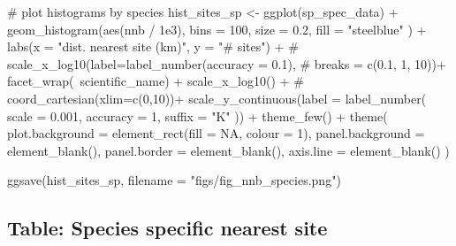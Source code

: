 \documentclass[]{article}
\newenvironment{Shaded}{}{}
\newcommand{\CommentTok}[1]{\textcolor[rgb]{0.00,0.50,0.00}{#1}}
\newcommand{\DataTypeTok}[1]{#1}
\newcommand{\DecValTok}[1]{#1}
\newcommand{\FloatTok}[1]{#1}
\newcommand{\KeywordTok}[1]{\textcolor[rgb]{0.00,0.00,1.00}{#1}}
\newcommand{\NormalTok}[1]{#1}
\newcommand{\OperatorTok}[1]{#1}
\newcommand{\OtherTok}[1]{\textcolor[rgb]{1.00,0.25,0.00}{#1}}
\newcommand{\StringTok}[1]{\textcolor[rgb]{0.00,0.50,0.50}{#1}}
\begin{document}
\begin{Shaded}
\begin{Highlighting}[]
\CommentTok{# plot histograms by species}
\NormalTok{hist_sites_sp <-}
\StringTok{  }\KeywordTok{ggplot}\NormalTok{(sp_spec_data) }\OperatorTok{+}
\StringTok{  }\KeywordTok{geom_histogram}\NormalTok{(}\KeywordTok{aes}\NormalTok{(nnb }\OperatorTok{/}\StringTok{ }\FloatTok{1e3}\NormalTok{),}
    \DataTypeTok{bins =} \DecValTok{100}\NormalTok{, }\DataTypeTok{size =} \FloatTok{0.2}\NormalTok{, }\DataTypeTok{fill =} \StringTok{"steelblue"}
\NormalTok{  ) }\OperatorTok{+}
\StringTok{  }\KeywordTok{labs}\NormalTok{(}\DataTypeTok{x =} \StringTok{"dist. nearest site (km)"}\NormalTok{, }\DataTypeTok{y =} \StringTok{"# sites"}\NormalTok{) }\OperatorTok{+}
\StringTok{  }\CommentTok{# scale_x_log10(label=label_number(accuracy = 0.1),}
\StringTok{  }\CommentTok{#               breaks = c(0.1, 1, 10))+}
\StringTok{  }\KeywordTok{facet_wrap}\NormalTok{(}\OperatorTok{~}\NormalTok{scientific_name) }\OperatorTok{+}
\StringTok{  }\KeywordTok{scale_x_log10}\NormalTok{() }\OperatorTok{+}
\StringTok{  }\CommentTok{# coord_cartesian(xlim=c(0,10))+}
\StringTok{  }\KeywordTok{scale_y_continuous}\NormalTok{(}\DataTypeTok{label =} \KeywordTok{label_number}\NormalTok{(}
    \DataTypeTok{scale =} \FloatTok{0.001}\NormalTok{, }\DataTypeTok{accuracy =} \DecValTok{1}\NormalTok{,}
    \DataTypeTok{suffix =} \StringTok{"K"}
\NormalTok{  )) }\OperatorTok{+}
\StringTok{  }\KeywordTok{theme_few}\NormalTok{() }\OperatorTok{+}
\StringTok{  }\KeywordTok{theme}\NormalTok{(}
    \DataTypeTok{plot.background =} \KeywordTok{element_rect}\NormalTok{(}\DataTypeTok{fill =} \OtherTok{NA}\NormalTok{, }\DataTypeTok{colour =} \DecValTok{1}\NormalTok{),}
    \DataTypeTok{panel.background =} \KeywordTok{element_blank}\NormalTok{(),}
    \DataTypeTok{panel.border =} \KeywordTok{element_blank}\NormalTok{(), }\DataTypeTok{axis.line =} \KeywordTok{element_blank}\NormalTok{()}
\NormalTok{  )}

\KeywordTok{ggsave}\NormalTok{(hist_sites_sp, }\DataTypeTok{filename =} \StringTok{"figs/fig_nnb_species.png"}\NormalTok{)}
\end{Highlighting}
\end{Shaded}

\hypertarget{table-species-specific-nearest-site}{%
\subsection{Table: Species specific nearest site}\label{table-species-specific-nearest-site}}
\end{document}
